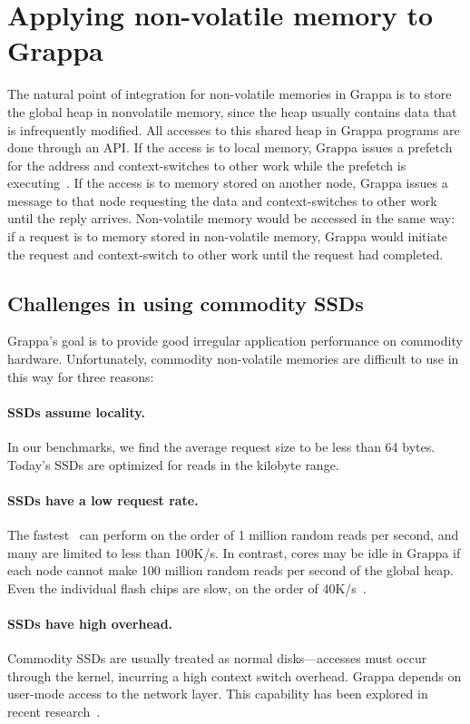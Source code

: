 \section{Applying non-volatile memory to Grappa}
The natural point of integration for non-volatile memories in Grappa
is to store the global heap in nonvolatile memory, since the heap
usually contains data that is infrequently modified. All accesses to
this shared heap in Grappa programs are done through an API. If the
access is to local memory, Grappa issues a prefetch for the address
and context-switches to other work while the prefetch is executing~\cite{Nelson:hotpar2011}. If
the access is to memory stored on another node, Grappa issues a
message to that node requesting the data and context-switches to other
work until the reply arrives. Non-volatile memory would be accessed in
the same way: if a request is to memory stored in non-volatile memory,
Grappa would initiate the request and context-switch to other work
until the request had completed.

\subsection{Challenges in using commodity SSDs}
Grappa's goal is to provide good irregular application performance on
commodity hardware. Unfortunately, commodity non-volatile memories are
difficult to use in this way for three reasons:

\paragraph{SSDs assume locality.} In our benchmarks, we find the average request size to be
less than 64 bytes. Today's SSDs are optimized for reads in the
kilobyte range.  

\paragraph{SSDs have a low request rate.} The fastest~\cite{fusionio} can
perform on the order of 1 million random reads per second, and many
are limited to less than 100K/s. In contrast, cores may be idle in
Grappa if each node cannot make 100 million random reads per second of
the global heap. Even the individual flash chips are slow, on the order of 40K/s~\cite{micronFlash}.

\paragraph{SSDs have high overhead.} Commodity SSDs are usually treated
as normal disks---accesses must occur through the kernel, incurring a
high context switch overhead. Grappa depends on user-mode access to
the network layer. This capability has been explored in recent research~\cite{caulfield:2012}.

